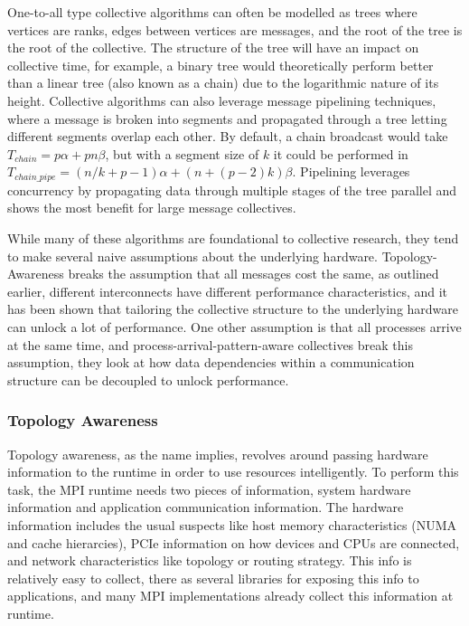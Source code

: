 One-to-all type collective algorithms can often be modelled as trees where vertices are ranks, edges between vertices are messages, and the root of the tree is the root of the collective.
The structure of the tree will have an impact on collective time, for example, a binary tree would theoretically perform better than a linear tree (also known as a chain) due to the logarithmic nature of its height.
Collective algorithms can also leverage message pipelining techniques, where a message is broken into segments and propagated through a tree letting different segments overlap each other.
By default, a chain broadcast would take $T_{chain}=p\alpha+pn\beta$, but with a segment size of $k$ it could be performed in $T_{chain\_pipe}=(n/k+p-1)\alpha+(n+(p-2)k)\beta$.
Pipelining leverages concurrency by propagating data through multiple stages of the tree parallel and shows the most benefit for large message collectives.

While many of these algorithms are foundational to collective research, they tend to make several naive assumptions about the underlying hardware.
Topology-Awareness breaks the assumption that all messages cost the same, as outlined earlier, different interconnects have different performance characteristics, and it has been shown that tailoring the collective structure to the underlying hardware can unlock a lot of performance. 
One other assumption is that all processes arrive at the same time, and process-arrival-pattern-aware collectives break this assumption, they look at how data dependencies within a communication structure can be decoupled to unlock performance.

\subsubsection{Topology Awareness}
Topology awareness, as the name implies, revolves around passing hardware information to the runtime in order to use resources intelligently.
To perform this task, the MPI runtime needs two pieces of information, system hardware information and application communication information.
The hardware information includes the usual suspects like host memory characteristics (NUMA and cache hierarcies), PCIe information on how devices and CPUs are connected, and network characteristics like topology or routing strategy.
This info is relatively easy to collect, there as several libraries for exposing this info to applications, and many MPI implementations already collect this information at runtime.

